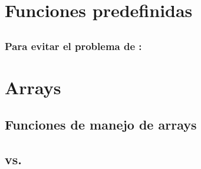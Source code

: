 \documentclass[a4paper,11pt,spanish]{sphinxmanual}
\begin{document}
\section{Funciones predefinidas}
\label{\detokenize{contenidos:id101}}

\subsection{}
\label{\detokenize{contenidos:id102}}

\subsection{}
\label{\detokenize{contenidos:id103}}

\subsubsection{Para evitar el problema de :}
\label{\detokenize{contenidos:id104}}
\begin{sphinxVerbatim}[commandchars=\\\{\}]
 
       
\end{sphinxVerbatim}


\section{Arrays}
\label{\detokenize{contenidos:id105}}

\subsection{Funciones de manejo de arrays}
\label{\detokenize{contenidos:id106}}

\subsection{}
\label{\detokenize{contenidos:id107}}

\subsection{ vs. }
\label{\detokenize{contenidos:id108}}
\end{document}
